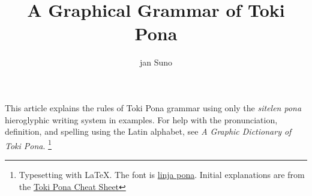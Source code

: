 \documentclass{article}
\title{A Graphical Grammar of Toki Pona \\[1ex]{\tp{nasin toki sitelen pi toki+pona}}}
\author{jan Suno}
\begin{document}
\maketitle
This article explains the rules of Toki Pona grammar
using only the \textit {sitelen pona} hieroglyphic
writing system in examples.  For help with the pronunciation,
definition, and spelling using the Latin alphabet, see
\textit {A Graphic Dictionary of Toki Pona}.
\footnote{Typesetting with LaTeX.  The font is
  \href{http://musilili.net/linja-pona/}{linja pona}.
  Initial explanations are from the
  \href{https://blinry.org/toki-pona-cheat-sheet}{Toki
    Pona Cheat Sheet}}

\newenvironment{ex}{
  \begin{adjustwidth}{0.5cm}{}}{\end{adjustwidth}}
\end{document}
